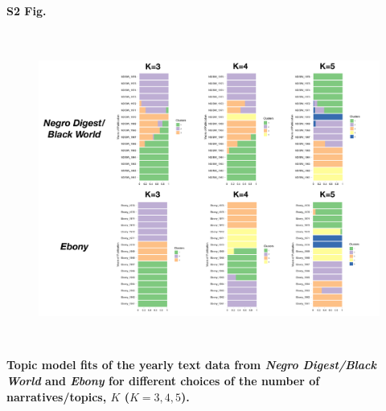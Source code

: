 \documentclass[10pt,letterpaper]{article}
\begin{document}
\paragraph*{S2 Fig.}

\begin{figure}[ht]
\centering
\includegraphics[height=4in, width=6in]{SuppFig2.pdf}
\end{figure}
\label{figS2}
{\bf Topic model fits of the yearly text data from \emph{Negro Digest/Black World} and \emph{Ebony} for different choices of the number of narratives/topics, $K$ ($K =3, 4, 5$).}
\end{document}
